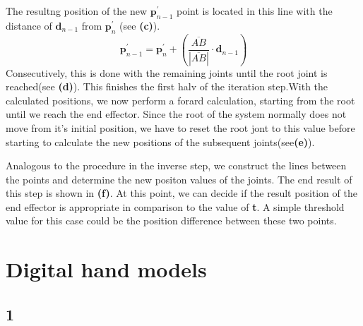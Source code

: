 The resultng position of the new $\textbf{p}_{n-1}^{'}$ point is located in this line with the distance of $\textbf{d}_{n-1}$ from $\textbf{p}_{n}^{'}$ (see \textbf{(c)}).
\begin{equation}
\textbf{p}_{n-1}^{'}= \textbf{p}_{n}^{'}+ \left(\frac{\overline{AB}}{|\overline{AB}|}\cdot\textbf{d}_{n-1}\right)
\end{equation}
Consecutively, this is done with the remaining joints until the root joint is reached(see \textbf{(d)}).
This finishes the first halv of the iteration step.With the calculated positions, we now perform a forard calculation, starting from the root until we reach the end effector. Since the root of the system normally does not move from it's initial position, we have to reset the root jont to this value before starting to calculate the new positions of the subsequent joints(see\textbf{(e)}).

Analogous to the procedure in the inverse step, we construct the lines between the points and determine the new positon values of the joints. The end result of this step is shown in \textbf{(f)}. At this point, we can decide if the result position of the end effector is appropriate in comparison to the value of \textbf{t}. A simple threshold value for this case could be the position difference between these two points.

\section{Digital hand models}

\subsection{1}